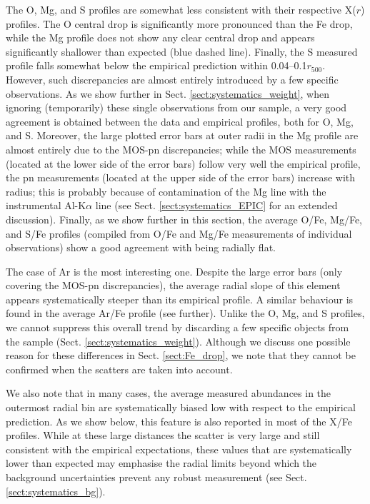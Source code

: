 \documentclass{aa}
\begin{document}
The O, Mg, and S profiles are somewhat less consistent with their respective X($r$) profiles. The O central drop is significantly more pronounced than the Fe drop, while the Mg profile does not show any clear central drop and appears significantly shallower than expected (blue dashed line). Finally, the S measured profile falls somewhat below the empirical prediction within 0.04--0.1$r_{500}$. However, such discrepancies are almost entirely introduced by a few specific observations. As we show further in Sect. \ref{sect:systematics_weight}, when ignoring (temporarily) these single observations from our sample, a very good agreement is obtained between the data and empirical profiles, both for O, Mg, and S. Moreover, the large plotted error bars at outer radii in the Mg profile are almost entirely due to the MOS-pn discrepancies; while the MOS measurements (located at the lower side of the error bars) follow very well the empirical profile, the pn measurements (located at the upper side of the error bars) increase with radius; this is probably because of contamination of the Mg line with the instrumental Al-K$\alpha$ line (see Sect. \ref{sect:systematics_EPIC} for an extended discussion).
Finally, as we show further in this section, the average O/Fe, Mg/Fe, and S/Fe profiles (compiled from O/Fe and Mg/Fe  measurements of individual observations) show a good agreement with being radially flat. 

The case of Ar is the most interesting one. Despite the large error bars (only covering the MOS-pn discrepancies), the average radial slope of this element appears systematically steeper than its empirical profile. A similar behaviour is found in the average Ar/Fe profile (see further). Unlike the O, Mg, and S profiles, we cannot suppress this overall trend by discarding a few specific objects from the sample (Sect. \ref{sect:systematics_weight}). Although we discuss one possible reason for these differences in Sect. \ref{sect:Fe_drop}, we note that they cannot be confirmed when the scatters are taken into account. 

We also note that in many cases, the average measured abundances in the outermost radial bin are systematically biased low with respect to the empirical prediction. As we show below, this feature is also reported in most of the X/Fe profiles. While at these large distances the scatter is very large and still consistent with the empirical expectations, these values that are systematically lower than expected may emphasise the radial limits beyond which the background uncertainties prevent any robust measurement (see Sect. \ref{sect:systematics_bg}).
\end{document}
